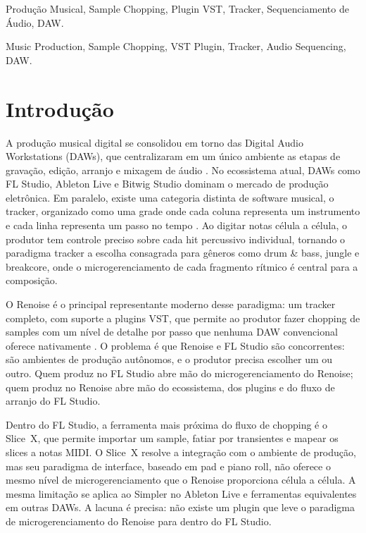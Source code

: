 \documentclass[portuguese]{sbc2025}
\begin{document}
\begin{frontmatter}
\begin{pchaves}
Produção Musical, Sample Chopping, Plugin VST, Tracker, Sequenciamento de Áudio, DAW.
\end{pchaves}

\begin{keywords}
Music Production, Sample Chopping, VST Plugin, Tracker, Audio Sequencing, DAW.
\end{keywords}

\end{frontmatter}


\section{Introdução}

A produção musical digital se consolidou em torno das Digital Audio Workstations (DAWs), que centralizaram em um único ambiente as etapas de gravação, edição, arranjo e mixagem de áudio \citep{izhaki2012mixing}. No ecossistema atual, DAWs como FL Studio, Ableton Live e Bitwig Studio dominam o mercado de produção eletrônica. Em paralelo, existe uma categoria distinta de software musical, o tracker, organizado como uma grade onde cada coluna representa um instrumento e cada linha representa um passo no tempo \citep{roads1996computer}. Ao digitar notas célula a célula, o produtor tem controle preciso sobre cada hit percussivo individual, tornando o paradigma tracker a escolha consagrada para gêneros como drum \& bass, jungle e breakcore, onde o microgerenciamento de cada fragmento rítmico é central para a composição.

O Renoise é o principal representante moderno desse paradigma: um tracker completo, com suporte a plugins VST, que permite ao produtor fazer chopping de samples com um nível de detalhe por passo que nenhuma DAW convencional oferece nativamente \citep{renoise}. O problema é que Renoise e FL Studio são concorrentes: são ambientes de produção autônomos, e o produtor precisa escolher um ou outro. Quem produz no FL Studio abre mão do microgerenciamento do Renoise; quem produz no Renoise abre mão do ecossistema, dos plugins e do fluxo de arranjo do FL Studio.

Dentro do FL Studio, a ferramenta mais próxima do fluxo de chopping é o Slice~X, que permite importar um sample, fatiar por transientes e mapear os slices a notas MIDI. O Slice~X resolve a integração com o ambiente de produção, mas seu paradigma de interface, baseado em pad e piano roll, não oferece o mesmo nível de microgerenciamento que o Renoise proporciona célula a célula. A mesma limitação se aplica ao Simpler no Ableton Live e ferramentas equivalentes em outras DAWs. A lacuna é precisa: não existe um plugin que leve o paradigma de microgerenciamento do Renoise para dentro do FL Studio.
\end{document}
